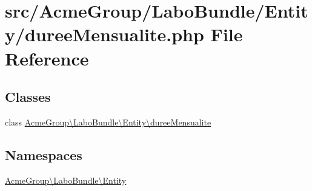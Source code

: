 \hypertarget{duree_mensualite_8php}{\section{src/\+Acme\+Group/\+Labo\+Bundle/\+Entity/duree\+Mensualite.php File Reference}
\label{duree_mensualite_8php}
}
\subsection*{Classes}
\begin{DoxyCompactItemize}
\item 
class \hyperlink{class_acme_group_1_1_labo_bundle_1_1_entity_1_1duree_mensualite}{Acme\+Group\textbackslash{}\+Labo\+Bundle\textbackslash{}\+Entity\textbackslash{}duree\+Mensualite}
\end{DoxyCompactItemize}
\subsection*{Namespaces}
\begin{DoxyCompactItemize}
\item 
 \hyperlink{namespace_acme_group_1_1_labo_bundle_1_1_entity}{Acme\+Group\textbackslash{}\+Labo\+Bundle\textbackslash{}\+Entity}
\end{DoxyCompactItemize}

